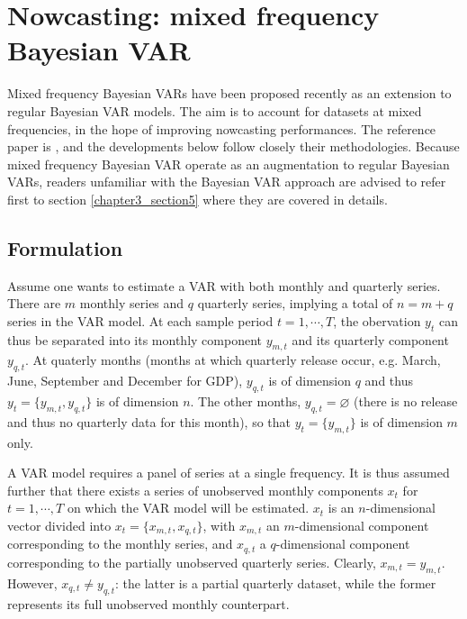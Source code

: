 \section{Nowcasting: mixed frequency Bayesian VAR}
\label{chapter3_section3}


Mixed frequency Bayesian VARs have been proposed recently as an extension to regular Bayesian VAR models. The aim is to account for datasets at mixed frequencies, in the hope of improving nowcasting performances. The reference paper is \cite{Schorfheide2015}, and the developments below follow closely their methodologies. Because mixed frequency Bayesian VAR operate as an augmentation to regular Bayesian VARs, readers unfamiliar with the Bayesian VAR approach are advised to refer first to section \ref{chapter3_section5} where they are covered in details.



\subsection{Formulation}
\label{chapter3_section3_subsection1}


Assume one wants to estimate a VAR with both monthly and quarterly series. There are $m$ monthly series and $q$ quarterly series, implying a total of $n = m + q$ series in the VAR model. At each sample period $t = 1, \cdots, T$, the obervation $y_t$ can thus be separated into its monthly component $y_{m,t}$ and its quarterly component $y_{q,t}$. At quaterly months (months at which quarterly release occur, e.g. March, June, September and December for GDP), $y_{q,t}$ is of dimension $q$ and thus $y_t = \{y_{m,t}, y_{q,t}\}$ is of dimension $n$. The other months, $y_{q,t} = \varnothing$ (there is no release and thus no quarterly data for this month), so that $y_t = \{y_{m,t}\}$ is of dimension $m$ only.

A VAR model requires a panel of series at a single frequency. It is thus assumed further that there exists a series of unobserved monthly components $x_t$ for $t = 1, \cdots, T$ on which the VAR model will be estimated. $x_t$ is an $n$-dimensional vector divided into $x_t = \{x_{m,t}, x_{q,t}\}$, with $x_{m,t}$ an $m$-dimensional component corresponding to the monthly series, and $x_{q,t}$ a $q$-dimensional component corresponding to the partially unobserved quarterly series. Clearly, $x_{m,t} = y_{m,t}$. However, $x_{q,t} \neq y_{q,t}$: the latter is a partial quarterly dataset, while the former represents its full unobserved monthly counterpart.

